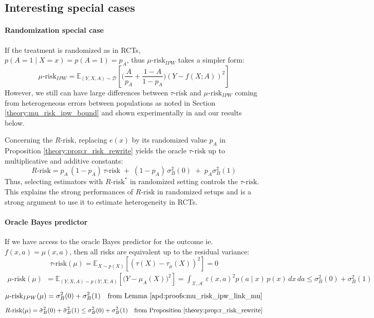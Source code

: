 \documentclass{report}
\begin{document}
\subsection{Interesting special cases}

\paragraph{Randomization special case}\label{remark:rct} If the treatment is
randomized as in RCTs, $p(A=1 \mid X=x) = p(A=1)=p_A$, thus
$\mu\text{-risk}_{IPW}$ takes a simpler form:
\begin{equation*}
  \mu\text{-risk}_{IPW} = \mathbb{E}_{(Y, X, A) \sim \mathcal D}\left[ \Big( \frac{A}{p_A} + \frac{1-A}{1-p_A} \Big) (Y-f(X ; A))^2 \right]
\end{equation*}
However, we still can have large differences
between $\tau\text{-risk}$ and $\mu\text{-risk}_{IPW}$ coming from heterogeneous
errors between populations as noted in Section \ref{theory:mu_risk_ipw_bound}
and shown experimentally in \citet{schuler_comparison_2018} and our
results below.

Concerning the $R\text{-risk}$, replacing $e(x)$ by its randomized value $p_A$
in Proposition \ref{theory:prop:r_risk_rewrite} yields the oracle
$\tau\text{-risk}$ up to multiplicative and additive constants:
\begin{equation*}
  R\text{-risk} = p_A \, (1-p_A) \, \tau\text{-risk} \;+\; (1 - p_A) \,\sigma_B^2(0) \;+\; p_A \sigma_B^2(1)
\end{equation*}
Thus, selecting estimators with $R\text{-risk}^*$ in
randomized setting controls the $\tau\text{-risk}$. This explains
the strong performances of $R\text{-risk}$ in randomized setups
\citep{schuler_comparison_2018} and is a strong argument to use it
to estimate heterogeneity in RCTs.

\paragraph{Oracle Bayes predictor}\label{remark:bayes_oracle} If we
have access to the oracle Bayes predictor for the outcome ie.~$f(x,
  a)=\mu(x, a)$, then all risks are equivalent up to the residual variance:
\begin{equation}
  \tau\text{-risk}(\mu) = \mathbb E_{X\sim p(X)}[(\tau(X) - \tau_{\mu}(X))^2] = 0
\end{equation}
\begin{align}
  \mu\text{-risk}(\mu) & = \mathbb E_{(Y, X, A) \sim p(Y;X;A)}[\big( Y - \mu_A(X)\big)^2]
  = \int_{\mathcal X, \mathcal A}
  \,\varepsilon(x,a)^2 p(a \mid x) \,p(x) \,dx\,da  \leq \sigma_B^{2}(0) + \sigma_B^{2}(1)
\end{align}
\begin{equation}
  \mu\text{-risk}_{IPW}(\mu) = \sigma_B^{2}(0) + \sigma_B^{2}(1)  \quad \text{from Lemma \ref{apd:proofs:mu_risk_ipw_link_mu}}
\end{equation}
\begin{equation}
  R\text{-risk}(\mu) = \tilde{\sigma}_B^{2}(0) + \tilde{\sigma}_B^{2}(1)
  \leq \sigma_B^{2}(0) + \sigma_B^{2}(1)  \quad  \text{from Proposition \ref{theory:prop:r_risk_rewrite}}%
\end{equation}
\end{document}
